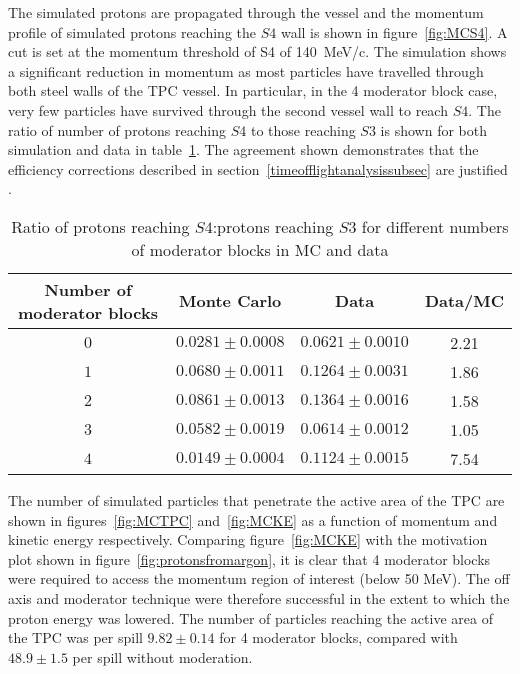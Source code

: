 The simulated protons are propagated through the vessel and the momentum profile of simulated protons reaching the $\mathit{S4}$ wall is shown in figure~\ref{fig:MCS4}. A cut is set at the momentum threshold of S4 of 140~MeV/c. The simulation shows a significant reduction in momentum as most particles have travelled through both steel walls of the TPC vessel. In particular, in the 4 moderator block case, very few particles have survived through the second vessel wall to reach $\mathit{S4}$. The ratio of number of protons reaching $\mathit{S4}$ to those reaching $\mathit{S3}$ is shown for both simulation and data in table~\ref{tab:ratios}. The agreement shown demonstrates that the efficiency corrections described in section~\ref{timeofflightanalysissubsec} are justified .

\begin{table}
  \centering
  \caption{Ratio of protons reaching $\mathit{S4}$:protons reaching $\mathit{S3}$ for different numbers of moderator blocks in MC and data}
  \begin{tabular}{|c|c|c|c|}
    \hline
    Number of moderator blocks & Monte Carlo & Data & Data/MC\\
    \hline
    $0$ & $0.0281 \pm 0.0008$ & $0.0621 \pm 0.0010$ & 2.21 \\
    $1$ & $0.0680 \pm 0.0011$ & $0.1264 \pm 0.0031$ & 1.86 \\
    $2$ & $0.0861 \pm 0.0013$ & $0.1364 \pm 0.0016$ & 1.58 \\
    $3$ & $0.0582 \pm 0.0019$ & $0.0614 \pm 0.0012$ & 1.05 \\
    $4$ & $0.0149 \pm 0.0004$ & $0.1124 \pm 0.0015$ & 7.54\\
    \hline
  \end{tabular}
  \label{tab:ratios}
\end{table}

The number of simulated particles that penetrate the active area of the TPC are shown in figures~\ref{fig:MCTPC} and~\ref{fig:MCKE} as a function of momentum and kinetic energy respectively. Comparing figure~\ref{fig:MCKE} with the motivation plot shown in figure~\ref{fig:protonsfromargon}, it is clear that 4 moderator blocks were required to access the momentum region of interest (below 50 MeV). The off axis and moderator technique were therefore successful in the extent to which the proton energy was lowered.
The number of particles reaching the active area of the TPC was  per spill $9.82 \pm  0.14$ for 4 moderator blocks, compared with $48.9 \pm 1.5$ per spill without moderation.

